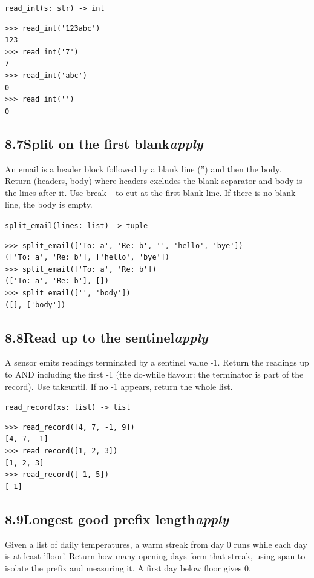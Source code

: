 \documentclass[10pt,letterpaper]{book}
\begin{document}
\noindent\texttt{read\_int(s: str) -> int}
\begin{lstlisting}[style=ex]
>>> read_int('123abc')
123
>>> read_int('7')
7
>>> read_int('abc')
0
>>> read_int('')
0
\end{lstlisting}
\subsection*{8.7\quad Split on the first blank\hfill\textnormal{\textit{apply}}}
An email is a header block followed by a blank line ('') and then the body. Return (headers, body) where headers excludes the blank separator and body is the lines after it. Use break\_ to cut at the first blank line. If there is no blank line, the body is empty.

\noindent\texttt{split\_email(lines: list) -> tuple}
\begin{lstlisting}[style=ex]
>>> split_email(['To: a', 'Re: b', '', 'hello', 'bye'])
(['To: a', 'Re: b'], ['hello', 'bye'])
>>> split_email(['To: a', 'Re: b'])
(['To: a', 'Re: b'], [])
>>> split_email(['', 'body'])
([], ['body'])
\end{lstlisting}

\subsection*{8.8\quad Read up to the sentinel\hfill\textnormal{\textit{apply}}}
A sensor emits readings terminated by a sentinel value -1. Return the readings up to AND including the first -1 (the do-while flavour: the terminator is part of the record). Use takeuntil. If no -1 appears, return the whole list.

\noindent\texttt{read\_record(xs: list) -> list}
\begin{lstlisting}[style=ex]
>>> read_record([4, 7, -1, 9])
[4, 7, -1]
>>> read_record([1, 2, 3])
[1, 2, 3]
>>> read_record([-1, 5])
[-1]
\end{lstlisting}
\subsection*{8.9\quad Longest good prefix length\hfill\textnormal{\textit{apply}}}
Given a list of daily temperatures, a warm streak from day 0 runs while each day is at least 'floor'. Return how many opening days form that streak, using span to isolate the prefix and measuring it. A first day below floor gives 0.
\end{document}
